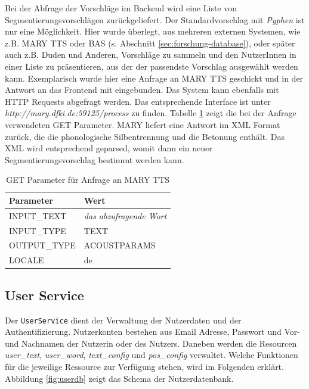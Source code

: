 Bei der Abfrage der Vorschläge im Backend wird eine Liste von Segmentierungsvorschlägen zurückgeliefert. Der Standardvorschlag mit \textit{Pyphen} ist nur eine Möglichkeit. Hier wurde überlegt, aus mehreren externen Systemen, wie z.B. MARY TTS oder BAS (s. Abschnitt \ref{sec:forschung-database}), oder später auch z.B. Duden und Anderen, Vorschläge zu sammeln und den NutzerInnen in einer Liste zu präsentieren, aus der der passendste Vorschlag ausgewählt werden kann. Exemplarisch wurde hier eine Anfrage an MARY TTS geschickt und in der Antwort an das Frontend mit eingebunden. Das System kann ebenfalls mit HTTP Requests abgefragt werden. Das entsprechende Interface ist unter \textit{http://mary.dfki.de:59125/process} zu finden. Tabelle \ref{table:mary} zeigt die bei der Anfrage verwendeten GET Parameter. MARY liefert eine Antwort im XML Format zurück, die die phonologische Silbentrennung und die Betonung enthält. Das XML wird entsprechend geparsed, womit dann ein neuer Segmentierungsvorschlag bestimmt werden kann.

\begin{table}[h!]
	\centering
	\begin{tabular}{|l|l|}
		\hline
		\textbf{Parameter} & \textbf{Wert}\\
		\hline
		\hline
		INPUT\_TEXT & \textit{das abzufragende Wort}\\
		INPUT\_TYPE & TEXT\\
		OUTPUT\_TYPE & ACOUSTPARAMS\\
		LOCALE & de\\
		\hline
	\end{tabular}
	\caption{GET Parameter für Anfrage an MARY TTS}
	\label{table:mary}
\end{table}

\subsection{User Service}
\label{sec:userservice}

Der \texttt{UserService} dient der Verwaltung der Nutzerdaten und der Authentifizierung. Nutzerkonten bestehen aus Email Adresse, Passwort und Vor- und Nachnamen der Nutzerin oder des Nutzers. Daneben werden die Resourcen \textit{user\_text}, \textit{user\_word}, \textit{text\_config} und \textit{pos\_config} verwaltet. Welche Funktionen für die jeweilige Ressource zur Verfügung stehen, wird im Folgenden erklärt. Abbildung \ref{fig:userdb} zeigt das Schema der Nutzerdatenbank.

